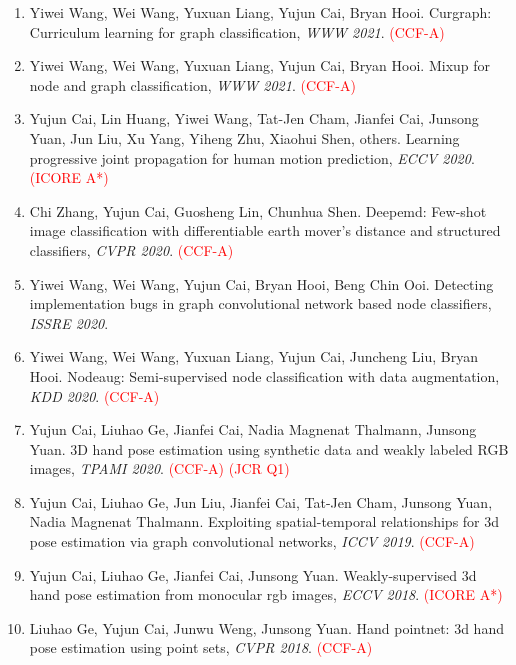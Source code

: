 \begin{enumerate}
\item Yiwei Wang, Wei Wang, Yuxuan Liang, Yujun Cai, Bryan Hooi. Curgraph: Curriculum learning for graph classification, \textit{WWW 2021}. \textcolor{red}{(CCF-A)}

\item Yiwei Wang, Wei Wang, Yuxuan Liang, Yujun Cai, Bryan Hooi. Mixup for node and graph classification, \textit{WWW 2021}. \textcolor{red}{(CCF-A)}

\item Yujun Cai, Lin Huang, Yiwei Wang, Tat-Jen Cham, Jianfei Cai, Junsong Yuan, Jun Liu, Xu Yang, Yiheng Zhu, Xiaohui Shen, others. Learning progressive joint propagation for human motion prediction, \textit{ECCV 2020}. \textcolor{red}{(ICORE A*)}

\item Chi Zhang, Yujun Cai, Guosheng Lin, Chunhua Shen. Deepemd: Few-shot image classification with differentiable earth mover's distance and structured classifiers, \textit{CVPR 2020}. \textcolor{red}{(CCF-A)}

\item Yiwei Wang, Wei Wang, Yujun Cai, Bryan Hooi, Beng Chin Ooi. Detecting implementation bugs in graph convolutional network based node classifiers, \textit{ISSRE 2020}.

\item Yiwei Wang, Wei Wang, Yuxuan Liang, Yujun Cai, Juncheng Liu, Bryan Hooi. Nodeaug: Semi-supervised node classification with data augmentation, \textit{KDD 2020}. \textcolor{red}{(CCF-A)}

\item Yujun Cai, Liuhao Ge, Jianfei Cai, Nadia Magnenat Thalmann, Junsong Yuan. 3D hand pose estimation using synthetic data and weakly labeled RGB images, \textit{TPAMI 2020}. \textcolor{red}{(CCF-A)} \textcolor{red}{(JCR Q1)}

\item Yujun Cai, Liuhao Ge, Jun Liu, Jianfei Cai, Tat-Jen Cham, Junsong Yuan, Nadia Magnenat Thalmann. Exploiting spatial-temporal relationships for 3d pose estimation via graph convolutional networks, \textit{ICCV 2019}. \textcolor{red}{(CCF-A)}

\item Yujun Cai, Liuhao Ge, Jianfei Cai, Junsong Yuan. Weakly-supervised 3d hand pose estimation from monocular rgb images, \textit{ECCV 2018}. \textcolor{red}{(ICORE A*)}

\item Liuhao Ge, Yujun Cai, Junwu Weng, Junsong Yuan. Hand pointnet: 3d hand pose estimation using point sets, \textit{CVPR 2018}. \textcolor{red}{(CCF-A)}
\end{enumerate}
